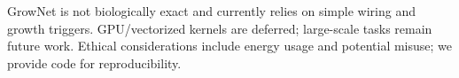 GrowNet is not biologically exact and currently relies on simple wiring and growth triggers. GPU/vectorized kernels are deferred; large-scale tasks remain future work. Ethical considerations include energy usage and potential misuse; we provide code for reproducibility.